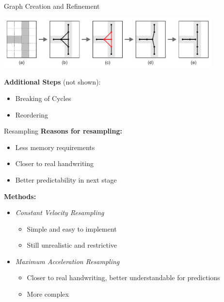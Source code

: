 \documentclass[aspectratio=169]{beamer}
\begin{document}
\begin{frame}{Graph Creation and Refinement}
\begin{center}
\includegraphics[width=0.85\textwidth]{../thesis/assets/sampling/cluster_removal/cluster_removal.pdf}
\end{center}
\textbf{Additional Steps} (not shown):
\begin{itemize}
\item Breaking of Cycles
\item Reordering
\end{itemize}
\end{frame}



\begin{frame}{Resampling}
\textbf{Reasons for resampling:}
\begin{itemize}
\item Less memory requirements
\item Closer to real handwriting
\item Better predictability in next stage
\end{itemize}
\vspace{1em}
\textbf{Methods:}
\begin{itemize}
\item \emph{Constant Velocity Resampling}
\begin{itemize}
\item Simple and easy to implement
\item Still unrealistic and restrictive
\end{itemize}
\item \emph{Maximum Acceleration Resampling}
\begin{itemize}
\item Closer to real handwriting, better understandable for predictions
\item More complex
\end{itemize}
\end{itemize}
\end{frame}
\end{document}
